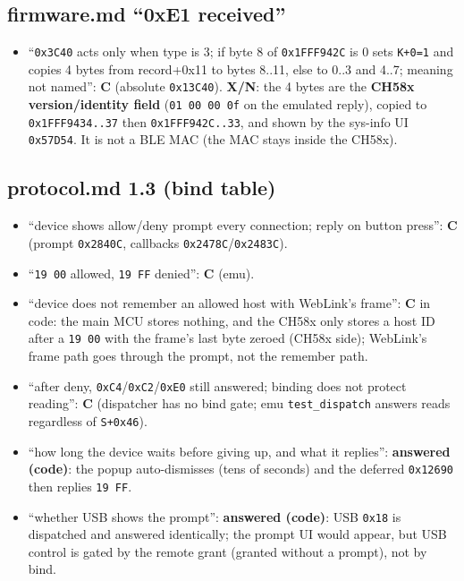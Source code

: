 \subsection{firmware.md ``0xE1
received''}\label{firmware.md-0xe1-received}

\begin{itemize}
\tightlist
\item
  ``\texttt{0x3C40} acts only when type is 3; if byte 8 of
  \texttt{0x1FFF942C} is 0 sets \texttt{K+0=1} and copies 4 bytes from
  record+0x11 to bytes 8..11, else to 0..3 and 4..7; meaning not
  named'': \textbf{C} (absolute \texttt{0x13C40}). \textbf{X/N}: the 4
  bytes are the \textbf{CH58x version/identity field}
  (\texttt{01\ 00\ 00\ 0f} on the emulated reply), copied to
  \texttt{0x1FFF9434..37} then \texttt{0x1FFF942C..33}, and shown by the
  sys-info UI \texttt{0x57D54}. It is not a BLE MAC (the MAC stays
  inside the CH58x).
\end{itemize}

\subsection{protocol.md 1.3 (bind
table)}\label{protocol.md-1.3-bind-table}

\begin{itemize}
\tightlist
\item
  ``device shows allow/deny prompt every connection; reply on button
  press'': \textbf{C} (prompt \texttt{0x2840C}, callbacks
  \texttt{0x2478C}/\texttt{0x2483C}).
\item
  ``\texttt{19\ 00} allowed, \texttt{19\ FF} denied'': \textbf{C} (emu).
\item
  ``device does not remember an allowed host with WebLink's frame'':
  \textbf{C} in code: the main MCU stores nothing, and the CH58x only
  stores a host ID after a \texttt{19\ 00} with the frame's last byte
  zeroed (CH58x side); WebLink's frame path goes through the prompt, not
  the remember path.
\item
  ``after deny, \texttt{0xC4}/\texttt{0xC2}/\texttt{0xE0} still
  answered; binding does not protect reading'': \textbf{C} (dispatcher
  has no bind gate; emu \texttt{test\_dispatch} answers reads regardless
  of \texttt{S+0x46}).
\item
  ``how long the device waits before giving up, and what it replies'':
  \textbf{answered (code)}: the popup auto-dismisses (tens of seconds)
  and the deferred \texttt{0x12690} then replies \texttt{19\ FF}.
\item
  ``whether USB shows the prompt'': \textbf{answered (code)}: USB
  \texttt{0x18} is dispatched and answered identically; the prompt UI
  would appear, but USB control is gated by the remote grant (granted
  without a prompt), not by bind.
\end{itemize}

